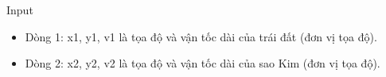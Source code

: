 Input
\begin{itemize}
	\item     Dòng 1: x1, y1, v1 là tọa độ và vận tốc dài của trái đất (đơn vị tọa độ).   
	\item      Dòng 2: x2, y2, v2 là tọa độ và vận tốc dài của sao Kim (đơn vị tọa độ).    
\end{itemize}